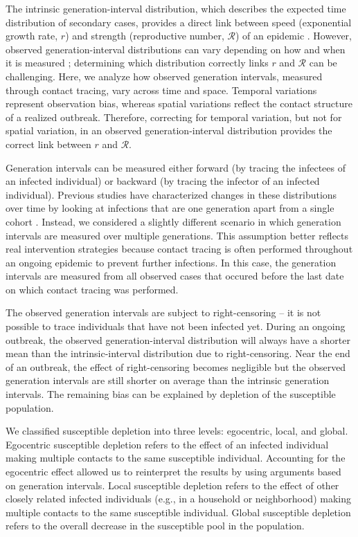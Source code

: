 \documentclass[12pt]{article}
\newcommand{\RR}{\ensuremath{{\mathcal R}}}
\begin{document}
The intrinsic generation-interval distribution, which describes the expected time distribution of secondary cases, provides a direct link between speed (exponential growth rate, $r$) and strength (reproductive number, $\RR$) of an epidemic \citep{wallinga2007generation, svensson2007note, svensson2015influence, park2019practical}.
However, observed generation-interval distributions can vary depending on how and when it is measured \citep{nishiura2010time, tomba2010some, champredon2015intrinsic, britton2019estimation};
determining which distribution correctly links $r$ and $\RR$ can be challenging.
Here, we analyze how observed generation intervals, measured through contact tracing, vary across time and space.
Temporal variations represent observation bias, whereas spatial variations reflect the contact structure of a realized outbreak.
Therefore, correcting for temporal variation, but not for spatial variation, in an observed generation-interval distribution provides the correct link between $r$ and $\RR$.

Generation intervals can be measured either forward (by tracing the infectees of an infected individual) or backward (by tracing the infector of an infected individual).
Previous studies have characterized changes in these distributions over time by looking at infections that are one generation apart from a single cohort \citep{kenah2008generation, nishiura2010time, tomba2010some, champredon2015intrinsic, britton2019estimation}.
Instead, we considered a slightly different scenario in which generation intervals are measured over multiple generations.
This assumption better reflects real intervention strategies because contact tracing is often performed throughout an ongoing epidemic to prevent further infections. 
In this case, the generation intervals are measured from all observed cases that occured before the last date on which contact tracing was performed.

The observed generation intervals are subject to right-censoring -- it is not possible to trace individuals that have not been infected yet.
During an ongoing outbreak, the observed generation-interval distribution will always have a shorter mean than the intrinsic-interval distribution due to right-censoring.
Near the end of an outbreak, the effect of right-censoring becomes negligible but the observed generation intervals are still shorter on average than the intrinsic generation intervals.
The remaining bias can be explained by depletion of the susceptible population.

We classified susceptible depletion into three levels: egocentric, local, and global.
Egocentric susceptible depletion refers to the effect of an infected individual making multiple contacts to the same susceptible individual.
Accounting for the egocentric effect allowed us to reinterpret the results by \cite{trapman2016inferring} using arguments based on generation intervals.
Local susceptible depletion refers to the effect of other closely related infected individuals (e.g., in a household or neighborhood) making multiple contacts to the same susceptible individual.
Global susceptible depletion refers to the overall decrease in the susceptible pool in the population.
\end{document}
